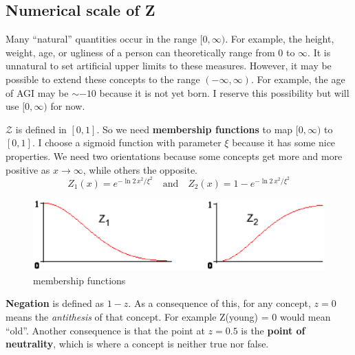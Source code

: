 \subsection{Numerical scale of Z}
\label{sec:gradedness}

Many ``natural'' quantities occur in the range $[0,\infty)$.  For example, the height, weight, age, or ugliness of a person can theoretically range from 0 to $\infty$.  It is unnatural to set artificial upper limits to these measures.  However, it may be possible to extend these concepts to the range $(-\infty,\infty)$.  For example, the age of AGI may be $\sim-10$ because it is not yet born.  I reserve this possibility but will use $[0,\infty)$ for now.

$\mathcal{Z}$ is defined in $[0,1]$.  So we need \textbf{membership functions} to map $[0,\infty)$ to $[0,1]$.  I choose a sigmoid function with parameter $\xi$ because it has some nice properties.  We need two orientations because some concepts get more and more positive as $x \rightarrow \infty$, while others the opposite.
\begin{equation}
Z_1(x) = e^{{-\ln 2 \, x^2}/{\xi^2}} \quad \mbox{and} \quad Z_2(x) = 1-e^{{- \ln 2 \, x^2}/{\xi^2}} 
\end{equation}
\begin{figure}[H]
\centering
\includegraphics[scale=0.7]{MappingFunctions.eps}
\caption{membership functions}
\end{figure}

\textbf{Negation} is defined as $1-z$.  As a consequence of this, for any concept, $z = 0$ means the \textit{antithesis} of that concept.  For example Z(young) = 0 would mean ``old''.  Another consequence is that the point at $z = 0.5$ is the \textbf{point of neutrality}, which is where a concept is neither true nor false.

